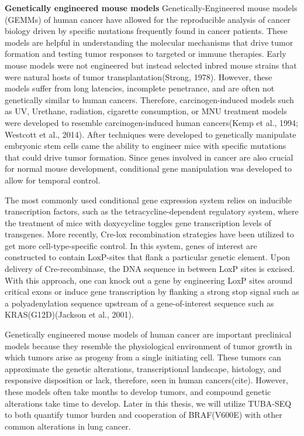 \textbf{Genetically engineered mouse models} Genetically-Engineered mouse models (GEMMs) of human cancer have allowed for the reproducible analysis of cancer biology driven by specific mutations frequently found in cancer patients. These models are helpful in understanding the molecular mechanisms that drive tumor formation and testing tumor responses to targeted or immune therapies. Early mouse models were not engineered but instead selected inbred mouse strains that were natural hosts of tumor transplantation(Strong, 1978). However, these models suffer from long latencies, incomplete penetrance, and are often not genetically similar to human cancers. Therefore, carcinogen-induced models such as UV, Urethane, radiation, cigarette consumption, or MNU treatment models were developed to resemble carcinogen-induced human cancers(Kemp et al., 1994; Westcott et al., 2014). After techniques were developed to genetically manipulate embryonic stem cells came the ability to engineer mice with specific mutations that could drive tumor formation. Since genes involved in cancer are also crucial for normal mouse development, conditional gene manipulation was developed to allow for temporal control.

The most commonly used conditional gene expression system relies on inducible transcription factors, such as the tetracycline-dependent regulatory system, where the treatment of mice with doxycycline toggles gene transcription levels of transgenes. More recently, Cre-lox recombination strategies have been utilized to get more cell-type-specific control. In this system, genes of interest are constructed to contain LoxP-sites that flank a particular genetic element. Upon delivery of Cre-recombinase, the DNA sequence in between LoxP sites is excised. With this approach, one can knock out a gene by engineering LoxP sites around critical exons or induce gene transcription by flanking a strong stop signal such as a polyadenylation sequence upstream of a gene-of-interest sequence such as KRAS(G12D)(Jackson et al., 2001).

Genetically engineered mouse models of human cancer are important preclinical models because they resemble the physiological environment of tumor growth in which tumors arise as progeny from a single initiating cell. These tumors can approximate the genetic alterations, transcriptional landscape, histology, and responsive disposition or lack, therefore, seen in human cancers(cite). However, these models often take months to develop tumors, and compound genetic alterations take time to develop. Later in this thesis, we will utilize TUBA-SEQ to both quantify tumor burden and cooperation of BRAF(V600E) with other common alterations in lung cancer.

